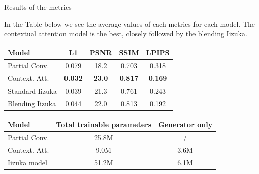 \documentclass[aspectratio=43]{beamer}
\begin{document}
	\begin{frame}{Results of the metrics} 
		
		In the Table below we see the average values of each metrics for each model. The contextual attention model is the best, closely followed by the blending Iizuka.
		
		\begin{table}[htbp]
			\centering
			\vspace{5pt}
			\label{tab:model_comparison}
			\begin{tabular}{lcccc}
				\hline
				\textbf{Model} & \textbf{L1} & \textbf{PSNR} & \textbf{SSIM} & \textbf{LPIPS} \\
				\hline
				Partial Conv.   & 0.079 & 18.2 & 0.703 & 0.318 \\
				Context. Att.   & \textbf{0.032} & \textbf{23.0} & \textbf{0.817} & \textbf{0.169} \\
				Standard Iizuka & 0.039 & 21.3 & 0.761 & 0.243 \\
				Blending Iizuka & 0.044 & 22.0 & 0.813 & 0.192 \\
				\hline
			\end{tabular}
		\end{table}
		
		\begin{table}[htbp]
			\centering
			\vspace{5pt}
			\label{tab:model_parameters}
			\begin{tabular}{lcc}
				\hline
				\textbf{Model} & \textbf{Total trainable parameters} & \textbf{Generator only} \\
				\hline
				Partial Conv.   & 25.8M & / \\
				Context. Att.   & 9.0M & 3.6M \\
				Iizuka model    & 51.2M & 6.1M \\
				\hline
			\end{tabular}
		\end{table}
	\end{frame}
	
	
	
	
	
\end{document}
